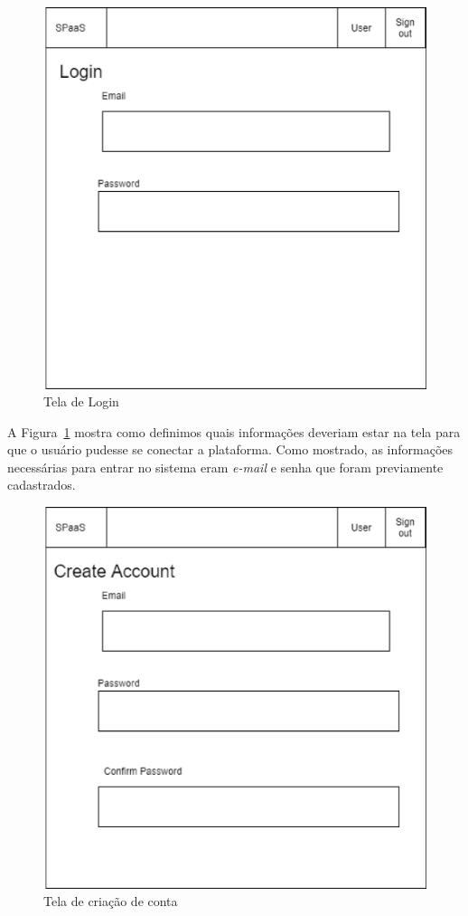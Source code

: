 \documentclass[11pt,twoside]{article}
\begin{document}
\begin{figure}[!h]
  \centering
  \includegraphics[scale=0.4]{login.eps}
  \caption{Tela de Login}
  \label{fig:loginScreen}
\end{figure}

A Figura~\ref{fig:loginScreen} mostra como definimos quais informações deveriam estar na tela para que o usuário pudesse se conectar a plataforma. Como mostrado, 
as informações necessárias para entrar no sistema eram \emph{e-mail} e senha que foram previamente cadastrados.

\begin{figure}[!h]
  \centering
  \includegraphics[scale=0.4]{account_reg.eps}
  \caption{Tela de criação de conta}
  \label{fig:createScreen}
\end{figure}
\end{document}
